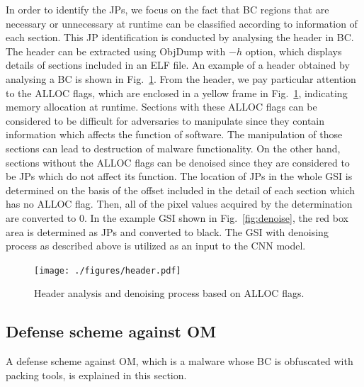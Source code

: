 \documentclass{ieeeaccess}
\newcommand{\myfigurename}{Fig.}
\begin{document}
In order to identify the JPs, we focus on the fact that BC regions that are necessary or unnecessary at runtime can be classified according to information of each section.
This JP identification is conducted by analysing the header in BC.
The header can be extracted using ObjDump with $-h$ option, which displays details of sections included in an ELF file.
An example of a header obtained by analysing a BC is shown in \myfigurename~\ref{fig:header}.
From the header, we pay particular attention to the ALLOC flags, which are enclosed in a yellow frame in \myfigurename~\ref{fig:header}, indicating memory allocation at runtime.
Sections with these ALLOC flags can be considered to be difficult for adversaries to manipulate since they contain information which affects the function of software.
The manipulation of those sections can lead to destruction of malware functionality.
On the other hand, sections without the ALLOC flags can be denoised since they are considered to be JPs which do not affect its function.
The location of JPs in the whole GSI is determined on the basis of the offset included in the detail of each section which has no ALLOC flag.
Then, all of the pixel values acquired by the determination are converted to 0.
In the example GSI shown in \myfigurename~\ref{fig:denoise}, the red box area is determined as JPs and converted to black.
The GSI with denoising process as described above is utilized as an input to the CNN model.
\begin{figure}[t]
 \centering
 \texttt{[image: ./figures/header.pdf]}
	\caption{Header analysis and denoising process based on ALLOC flags.} 
 \label{fig:header}
\end{figure}

\subsection{Defense scheme against OM}
A defense scheme against OM, which is a malware whose BC is obfuscated with packing tools, is explained in this section.
\end{document}
